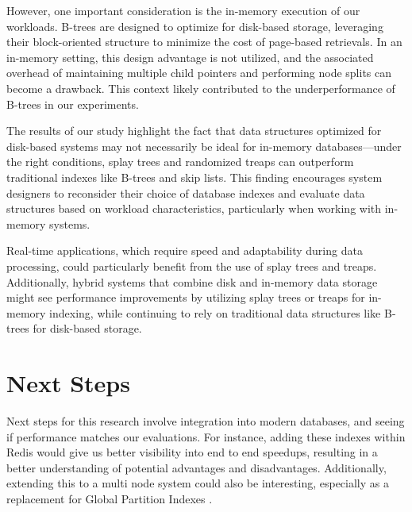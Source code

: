 \documentclass[sigconf]{acmart}
\begin{document}
However, one important consideration is the in-memory execution of our workloads. B-trees are designed to optimize for disk-based storage, leveraging their block-oriented structure to minimize the cost of page-based retrievals. In an in-memory setting, this design advantage is not utilized, and the associated overhead of maintaining multiple child pointers and performing node splits can become a drawback. This context likely contributed to the underperformance of B-trees in our experiments.

The results of our study highlight the fact that data structures optimized for disk-based systems may not necessarily be ideal for in-memory databases---under the right conditions, splay trees and randomized treaps can outperform traditional indexes like B-trees and skip lists. This finding encourages system designers to reconsider their choice of database indexes and evaluate data structures based on workload characteristics, particularly when working with in-memory systems.

Real-time applications, which require speed and adaptability during data processing, could particularly benefit from the use of splay trees and treaps. Additionally, hybrid systems that combine disk and in-memory data storage might see performance improvements by utilizing splay trees or treaps for in-memory indexing, while continuing to rely on traditional data structures like B-trees for disk-based storage.

\section{Next Steps}
Next steps for this research involve integration into modern databases, and seeing if performance matches our evaluations. For instance, adding these indexes within Redis would give us better visibility into end to end speedups, resulting in a better understanding of potential advantages and disadvantages. Additionally, extending this to a multi node system could also be interesting, especially as a replacement for Global Partition Indexes \cite{gpi}.

\clearpage



\end{document}
